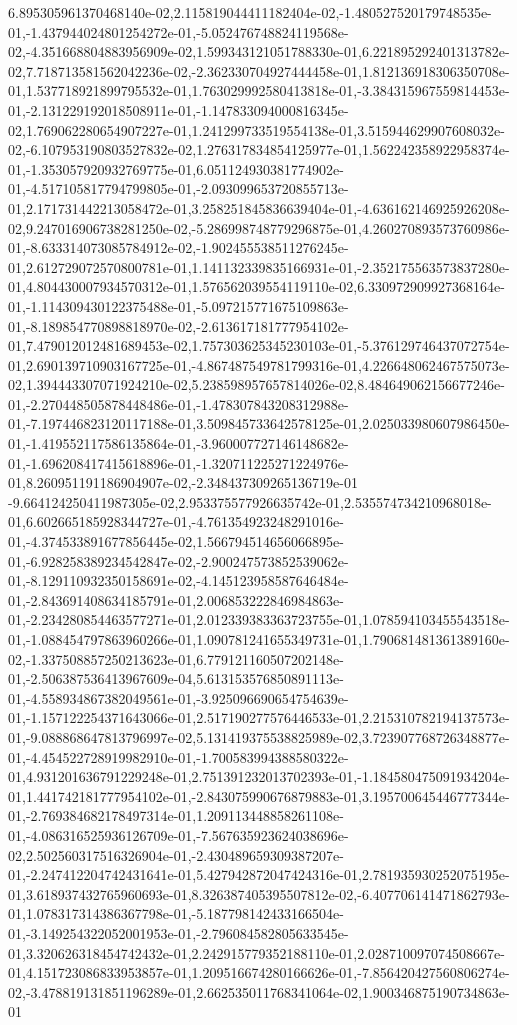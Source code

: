 6.895305961370468140e-02,2.115819044411182404e-02,-1.480527520179748535e-01,-1.437944024801254272e-01,-5.052476748824119568e-02,-4.351668804883956909e-02,1.599343121051788330e-01,6.221895292401313782e-02,7.718713581562042236e-02,-2.362330704927444458e-01,1.812136918306350708e-01,1.537718921899795532e-01,1.763029992580413818e-01,-3.384315967559814453e-01,-2.131229192018508911e-01,-1.147833094000816345e-02,1.769062280654907227e-01,1.241299733519554138e-01,3.515944629907608032e-02,-6.107953190803527832e-02,1.276317834854125977e-01,1.562242358922958374e-01,-1.353057920932769775e-01,6.051124930381774902e-01,-4.517105817794799805e-01,-2.093099653720855713e-01,2.171731442213058472e-01,3.258251845836639404e-01,-4.636162146925926208e-02,9.247016906738281250e-02,-5.286998748779296875e-01,4.260270893573760986e-01,-8.633314073085784912e-02,-1.902455538511276245e-01,2.612729072570800781e-01,1.141132339835166931e-01,-2.352175563573837280e-01,4.804430007934570312e-01,1.576562039554119110e-02,6.330972909927368164e-01,-1.114309430122375488e-01,-5.097215771675109863e-01,-8.189854770898818970e-02,-2.613617181777954102e-01,7.479012012481689453e-02,1.757303625345230103e-01,-5.376129746437072754e-01,2.690139710903167725e-01,-4.867487549781799316e-01,4.226648062467575073e-02,1.394443307071924210e-02,5.238598957657814026e-02,8.484649062156677246e-01,-2.270448505878448486e-01,-1.478307843208312988e-01,-7.197446823120117188e-01,3.509845733642578125e-01,2.025033980607986450e-01,-1.419552117586135864e-01,-3.960007727146148682e-01,-1.696208417415618896e-01,-1.320711225271224976e-01,8.260951191186904907e-02,-2.348437309265136719e-01
-9.664124250411987305e-02,2.953375577926635742e-01,2.535574734210968018e-01,6.602665185928344727e-01,-4.761354923248291016e-01,-4.374533891677856445e-02,1.566794514656066895e-01,-6.928258389234542847e-02,-2.900247573852539062e-01,-8.129110932350158691e-02,-4.145123958587646484e-01,-2.843691408634185791e-01,2.006853222846984863e-01,-2.234280854463577271e-01,2.012339383363723755e-01,1.078594103455543518e-01,-1.088454797863960266e-01,1.090781241655349731e-01,1.790681481361389160e-02,-1.337508857250213623e-01,6.779121160507202148e-01,-2.506387536413967609e-04,5.613153576850891113e-01,-4.558934867382049561e-01,-3.925096690654754639e-01,-1.157122254371643066e-01,2.517190277576446533e-01,2.215310782194137573e-01,-9.088868647813796997e-02,5.131419375538825989e-02,3.723907768726348877e-01,-4.454522728919982910e-01,-1.700583994388580322e-01,4.931201636791229248e-01,2.751391232013702393e-01,-1.184580475091934204e-01,1.441742181777954102e-01,-2.843075990676879883e-01,3.195700645446777344e-01,-2.769384682178497314e-01,1.209113448858261108e-01,-4.086316525936126709e-01,-7.567635923624038696e-02,2.502560317516326904e-01,-2.430489659309387207e-01,-2.247412204742431641e-01,5.427942872047424316e-01,2.781935930252075195e-01,3.618937432765960693e-01,8.326387405395507812e-02,-6.407706141471862793e-01,1.078317314386367798e-01,-5.187798142433166504e-01,-3.149254322052001953e-01,-2.796084582805633545e-01,3.320626318454742432e-01,2.242915779352188110e-01,2.028710097074508667e-01,4.151723086833953857e-01,1.209516674280166626e-01,-7.856420427560806274e-02,-3.478819131851196289e-01,2.662535011768341064e-02,1.900346875190734863e-01
